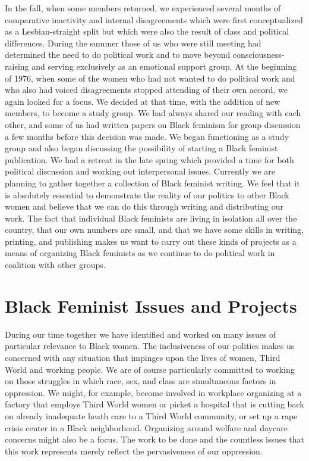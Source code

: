 \documentclass{article}
\begin{document}
In the fall, when some members returned, we experienced several months of
comparative inactivity and internal disagreements which were first
conceptualized as a Lesbian-straight split but which were also the result of
class and political differences. During the summer those of us who were still
meeting had determined the need to do political work and to move beyond
consciousness-raising and serving exclusively as an emotional support group. At
the beginning of 1976, when some of the women who had not wanted to do
political work and who also had voiced disagreements stopped attending of their
own accord, we again looked for a focus. We decided at that time, with the
addition of new members, to become a study group. We had always shared our
reading with each other, and some of us had written papers on Black feminism
for group discussion a few months before this decision was made. We began
functioning as a study group and also began discussing the possibility of
starting a Black feminist publication. We had a retreat in the late spring
which provided a time for both political discussion and working out
interpersonal issues. Currently we are planning to gather together a collection
of Black feminist writing. We feel that it is absolutely essential to
demonstrate the reality of our politics to other Black women and believe that
we can do this through writing and distributing our work. The fact that
individual Black feminists are living in isolation all over the country, that
our own numbers are small, and that we have some skills in writing, printing,
and publishing makes us want to carry out these kinds of projects as a means of
organizing Black feminists as we continue to do political work in coalition
with other groups.

\section{Black Feminist Issues and Projects}

During our time together we have identified and worked on many issues of
particular relevance to Black women. The inclusiveness of our politics makes us
concerned with any situation that impinges upon the lives of women, Third World
and working people. We are of course particularly committed to working on those
struggles in which race, sex, and class are simultaneous factors in oppression.
We might, for example, become involved in workplace organizing at a factory
that employs Third World women or picket a hospital that is cutting back on
already inadequate heath care to a Third World community, or set up a rape
crisis center in a Black neighborhood. Organizing around welfare and daycare
concerns might also be a focus. The work to be done and the countless issues
that this work represents merely reflect the pervasiveness of our oppression.
\end{document}
